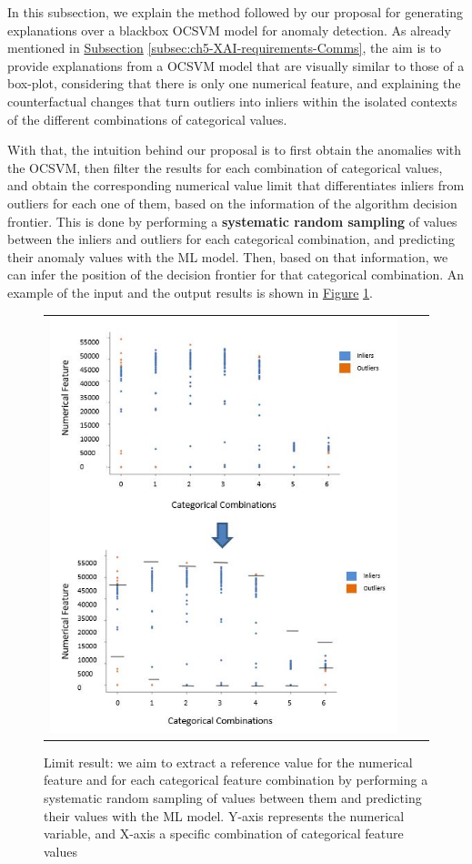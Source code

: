 In this subsection, we explain the method followed by our proposal for generating explanations over a blackbox OCSVM model for anomaly detection. As already mentioned in \hyperref[subsec:ch5-XAI-requirements-Comms]{Subsection} \ref{subsec:ch5-XAI-requirements-Comms}, the aim is to provide explanations from a OCSVM model that are visually similar to those of a box-plot, considering that there is only one numerical feature, and explaining the counterfactual changes that turn outliers into inliers within the isolated contexts of the different combinations of categorical values.

With that, the intuition behind our proposal is to first obtain the anomalies with the OCSVM, then filter the results for each combination of categorical values, and obtain the corresponding numerical value limit that differentiates inliers from outliers for each one of them, based on the information of the algorithm decision frontier. This is done by performing a \textbf{systematic random sampling} of values between the inliers and outliers for each categorical combination, and predicting their anomaly values with the ML model. Then, based on that information, we can infer the position of the decision frontier for that categorical combination. An example of the input and the output results is shown in \hyperref[fig:ch5-comms-limits-objective]{Figure} \ref{fig:ch5-comms-limits-objective}.

\begin{figure}[h!]
\centering
  \begin{tabular}{c@{\qquad}c@{\qquad}c}
\includegraphics[width=0.70\columnwidth]{figures/chapter5_LucaComms/CommsLimits_Objective.JPG}
  \end{tabular} 
  \caption{Limit result: we aim to extract a reference value for the numerical feature and for each categorical feature combination by performing a systematic random sampling of values between them and predicting their values with the ML model. Y-axis represents the numerical variable, and X-axis a specific combination of categorical feature values \label{fig:ch5-comms-limits-objective}}
\end{figure}

